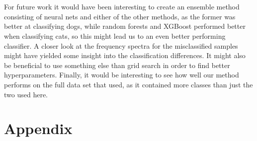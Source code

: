 \documentclass[a4paper]{article}
\newcommand\red[1]{\textcolor{red}{\textbf{#1}}}
\begin{document}
\\\\
For future work it would have been interesting to create an ensemble method consisting of neural nets and either of the other methods, as the former was better at classifying dogs, while random forests and XGBoost performed better when classifying cats, so this might lead us to an even better performing classifier. A closer look at the frequency spectra for the misclassified samples might have yielded some insight into the classification differences. It might also be beneficial to use something else than grid search in order to find better hyperparameters. Finally, it would be interesting to see how well our method performs on the full data set that \cite{Takahashi+2016} used, as it contained more classes than just the two used here.


\appendix
\section*{Appendix} \label{chap:appendix}
\end{document}
